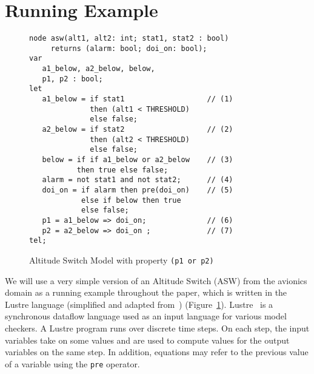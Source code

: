 \section{Running Example}
\label{sec:example}


\begin{figure}[t]
\centering
{\smaller
\begin{verbatim}
node asw(alt1, alt2: int; stat1, stat2 : bool)
     returns (alarm: bool; doi_on: bool);
var
   a1_below, a2_below, below,
   p1, p2 : bool;
let
   a1_below = if stat1                   // (1)
              then (alt1 < THRESHOLD)    
              else false;               
   a2_below = if stat2                   // (2)
              then (alt2 < THRESHOLD)    
              else false;                 
   below = if if a1_below or a2_below    // (3)
           then true else false;
   alarm = not stat1 and not stat2;      // (4)
   doi_on = if alarm then pre(doi_on)    // (5)
            else if below then true      
            else false;                  
   p1 = a1_below => doi_on;              // (6)
   p2 = a2_below => doi_on ;             // (7)
tel;
\end{verbatim}
}
\vspace{-0.1in}
\caption{Altitude Switch Model with property \small{\texttt{(p1 or p2)}}}
\label{fig:asw}
\end{figure}

We will use a very simple version of an Altitude Switch (ASW) from the avionics domain as a running example throughout the paper, which is written in the Lustre language (simplified and adapted from~\cite{HCW02:ase-deviation}) (Figure~\ref{fig:asw}).
Lustre~\cite{Halbwachs91:lustre} is a synchronous dataflow language
used as an input language for various model checkers. A Lustre program runs over discrete
time steps. On each step, the input variables take on some values and
are used to compute values for the output variables on the same step.
In addition, equations may refer to the previous value of a variable
using the {\tt pre} operator.


